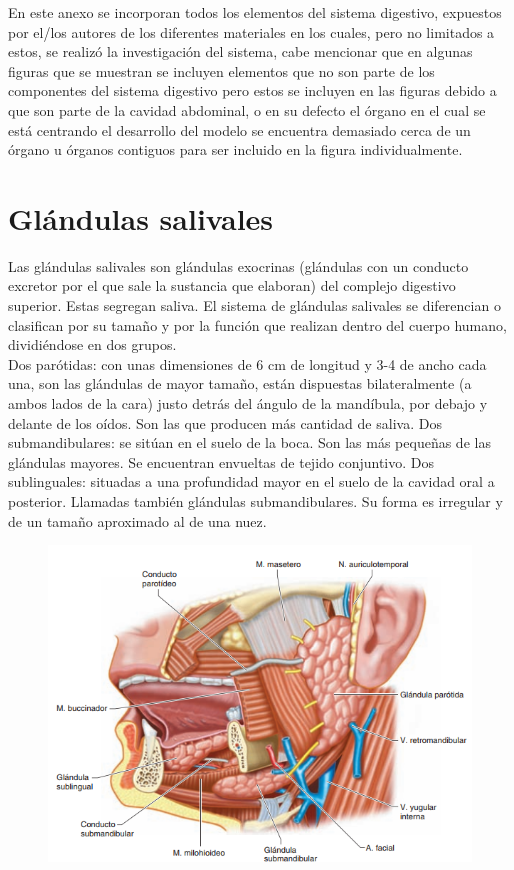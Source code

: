 \appendix  \label{app}
\addappheadtotoc 
\appendixpage

En este anexo se incorporan todos los elementos del sistema digestivo, expuestos por el/los autores de los diferentes materiales en los cuales, 
pero no limitados a estos, se realizó la investigación del sistema, cabe mencionar que en algunas figuras que se muestran se incluyen elementos 
que no son parte de los componentes del sistema digestivo pero estos se incluyen en las figuras debido a que son parte de la cavidad abdominal, 
o en su defecto el órgano en el cual se está centrando el desarrollo del modelo se encuentra demasiado cerca de un órgano u órganos contiguos 
para ser incluido en la figura individualmente.\\

\section{Glándulas salivales}
Las glándulas salivales son glándulas exocrinas (glándulas con un conducto excretor por el que sale la sustancia que elaboran) del complejo digestivo 
superior. Estas segregan saliva. El sistema de  glándulas salivales se diferencian o clasifican por  su tamaño y por la función que realizan dentro 
del cuerpo humano, dividiéndose en dos grupos.\\ 
Dos parótidas: con unas dimensiones de 6 cm de longitud y 3-4 de ancho cada una, son las glándulas de mayor tamaño, están dispuestas bilateralmente 
(a ambos lados de la cara) justo detrás del ángulo de la mandíbula, por debajo y delante de los oídos. Son las que producen más cantidad de saliva.
Dos submandibulares: se sitúan en el suelo de la boca. Son las más pequeñas de las glándulas mayores. Se encuentran envueltas de tejido conjuntivo.
Dos sublinguales: situadas a una profundidad mayor en el suelo de la cavidad oral a posterior. Llamadas también glándulas submandibulares. Su forma 
es irregular y de un tamaño aproximado al de una nuez.\\
\begin{figure}[H]
	\begin{center}
 		\includegraphics[width = .7\textwidth]{v2/images/image34.png}
	\end{center} 
\end{figure}

